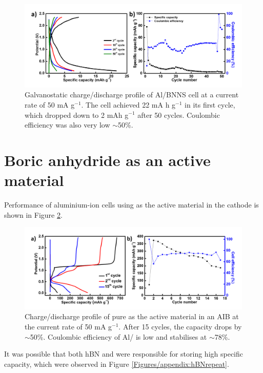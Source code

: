 \begin{figure}[tbh!]
\centering
\includegraphics[width=\textwidth]{Figures/BOhBN/BNNSCDCCE}
\caption{Galvanostatic charge/discharge profile of Al/BNNS cell at a current rate of 50 mA g$^{-1}$. The cell achieved 22 mA h g$^{-1}$ in its first cycle, which dropped down to 2 mAh g$^{-1}$ after 50 cycles. Coulombic efficiency was also very low $\sim$50\%. }
\label{Figures/BOhBN:BNNSCDCCE}
\end{figure}

\section*{Boric anhydride  as an active material}
Performance of aluminium-ion cells using  as the active material in the cathode is shown in Figure \ref{Figures/BOhBN:BOCDC}. 

\begin{figure}[tbh!]
\centering
\includegraphics[width=\textwidth]{Figures/BOhBN/BOCDC}
\caption{Charge/discharge profile of pure  as the active material in an AIB at the current rate of 50 mA g$^{-1}$. After 15 cycles, the capacity drops by $\sim$50\%. Coulombic efficiency of Al/ is low and  stabilises at $\sim$78\%.}
\label{Figures/BOhBN:BOCDC}
\end{figure}

It was possible that both hBN and  were responsible for storing high specific capacity, which were observed in Figure \ref{Figures/appendix:hBNrepeat}. 

